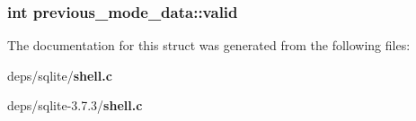 \subsubsection{\setlength{\rightskip}{0pt plus 5cm}int \bf{previous\_\-mode\_\-data::valid}}\label{structprevious__mode__data_6daa9128ad6cdd5b5e616505c1d35d81}




The documentation for this struct was generated from the following files:\begin{CompactItemize}
\item 
deps/sqlite/\bf{shell.c}\item 
deps/sqlite-3.7.3/\bf{shell.c}\end{CompactItemize}
